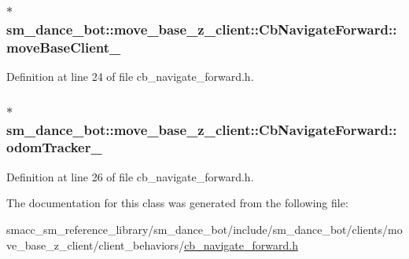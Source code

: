 \subsubsection[{\texorpdfstring{move\+Base\+Client\+\_\+}{moveBaseClient_}}]{$\ast$ sm\+\_\+dance\+\_\+bot\+::move\+\_\+base\+\_\+z\+\_\+client\+::\+Cb\+Navigate\+Forward\+::move\+Base\+Client\+\_\+}\hypertarget{classsm__dance__bot_1_1move__base__z__client_1_1CbNavigateForward_a717bce9f5100540c48e413725e476408}{}\label{classsm__dance__bot_1_1move__base__z__client_1_1CbNavigateForward_a717bce9f5100540c48e413725e476408}


Definition at line 24 of file cb\+\_\+navigate\+\_\+forward.\+h.

\subsubsection[{\texorpdfstring{odom\+Tracker\+\_\+}{odomTracker_}}]{$\ast$ sm\+\_\+dance\+\_\+bot\+::move\+\_\+base\+\_\+z\+\_\+client\+::\+Cb\+Navigate\+Forward\+::odom\+Tracker\+\_\+}\hypertarget{classsm__dance__bot_1_1move__base__z__client_1_1CbNavigateForward_affc6ced1bd3ba8cb80461a1a60c65d04}{}\label{classsm__dance__bot_1_1move__base__z__client_1_1CbNavigateForward_affc6ced1bd3ba8cb80461a1a60c65d04}


Definition at line 26 of file cb\+\_\+navigate\+\_\+forward.\+h.



The documentation for this class was generated from the following file\+:\begin{DoxyCompactItemize}
\item 
smacc\+\_\+sm\+\_\+reference\+\_\+library/sm\+\_\+dance\+\_\+bot/include/sm\+\_\+dance\+\_\+bot/clients/move\+\_\+base\+\_\+z\+\_\+client/client\+\_\+behaviors/\hyperlink{smacc__sm__reference__library_2sm__dance__bot_2include_2sm__dance__bot_2clients_2move__base__z__af7739851e4ad3a8f288f51062fe894a}{cb\+\_\+navigate\+\_\+forward.\+h}\end{DoxyCompactItemize}
